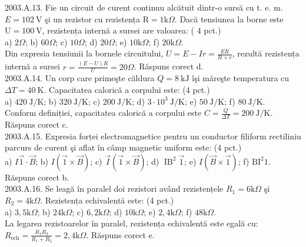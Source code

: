 2003.A.13. Fie un circuit de curent continuu alcătuit dintr-o sursă cu t. e. m. $E=102 \mathrm{~V}$ şi un rezistor cu rezistența $\mathrm{R}=1 \mathrm{k} \Omega$. Dacă tensiunea la borne este $\mathrm{U}=100 \mathrm{~V}$, rezistența internă a sursei are valoarea: ( 4 pct.)\\ a) $2 \Omega$; b) $60 \Omega$; c) $10 \Omega$; d) $20 \Omega$; e) $10 \mathrm{k} \Omega$; f) $20 \mathrm{k} \Omega$.\\ Din expresia tensiunii la bornele circuitului, $U=E-I r=\frac{E R}{R+r}$, rezultă rezistența internă a sursei $r=\frac{(E-U) R}{U}=20 \Omega$. Răspuns corect d.\\

2003.A.14. Un corp care primeşte căldura $Q=8 \mathrm{~kJ}$ îşi măreşte temperatura cu $\Delta T=40 \mathrm{~K}$. Capacitatea calorică a corpului este: (4 pct.)\\ a) $420 \mathrm{~J} / \mathrm{K}$; b) $320 \mathrm{~J} / \mathrm{K}$; c) $200 \mathrm{~J} / \mathrm{K}$; d) $3 \cdot 10^{3} \mathrm{~J} / \mathrm{K}$; e) $50 \mathrm{~J} / \mathrm{K}$; f) $80 \mathrm{~J} / \mathrm{K}$.\\ Conform definiției, capacitatea calorică a corpului este $C=\frac{Q}{\Delta T}=200 \mathrm{~J} / \mathrm{K}$. Răspuns corect c.\\

2003.A.15. Expresia forței electromagnetice pentru un conductor filiform rectiliniu parcurs de curent şi aflat în câmp magnetic uniform este: (4 pct.)\\ a) $I \overrightarrow{1} \cdot \vec{B}$; b) $I(\overrightarrow{1} \times \vec{B})$; c) $\vec{I}(\overrightarrow{1} \times \vec{B})$; d) $\operatorname{IB}^{2} \overrightarrow{1}$; e) $I(\vec{B} \times \overrightarrow{1})$; f) $\mathrm{BI}^{2} 1$.\\ Răspuns corect b.\\

2003.A.16. Se leagă în paralel doi rezistori având rezistențele $R_{1}=6 \mathrm{k} \Omega$ şi $R_{2}=4 \mathrm{k} \Omega$. Rezistența echivalentă este: (4 pct.)\\ a) $3,5 \mathrm{k} \Omega$; b) $24 \mathrm{k} \Omega$; c) $6,2 \mathrm{k} \Omega$; d) $10 \mathrm{k} \Omega$; e) $2,4 \mathrm{k} \Omega$; f) $48 \mathrm{k} \Omega$.\\ La legarea rezistoarelor în paralel, rezistența echivalentă este egală cu:\\ $R_{\text {ech}}=\frac{R_{1} R_{2}}{R_{1}+R_{2}}=2,4 \mathrm{k} \Omega$. Răspuns corect e.\\

